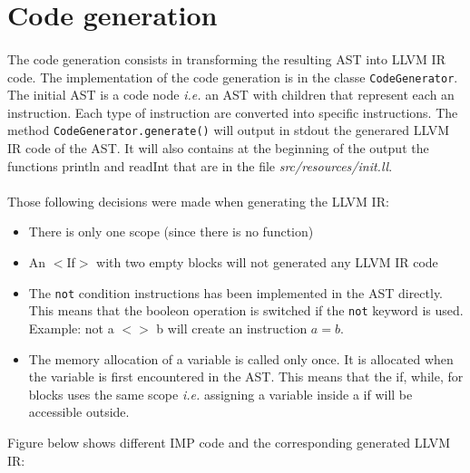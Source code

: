 \documentclass[letterpaper]{article}
\begin{document}
\section{Code generation}

\paragraph{}

The code generation consists in transforming the resulting AST into
LLVM IR code. The implementation of the code generation is in the
classe \texttt{CodeGenerator}. The initial AST is a code node \textit{i.e.}
an AST with children that represent each an instruction. Each type of
instruction are converted into specific instructions. The method
\texttt{CodeGenerator.generate()} will output in stdout the generared LLVM
IR code of the AST. It will also contains at the beginning of the output
the functions println and readInt that are in the file
 \textit{src/resources/init.ll}.

\paragraph{}


Those following
decisions were made when generating the LLVM IR:

\begin{itemize}
    \item There is only one scope (since there is no function)
    \item An $<$If$>$ with
    two empty blocks will not generated any LLVM IR code
    \item The \texttt{not} condition
    instructions has been implemented in the AST directly. This means that
    the booleon operation is switched if the \texttt{not} keyword is used.
    Example: not a $<>$ b will create an instruction $a = b$.
    \item The memory allocation of a variable is called only once.
    It is allocated when the variable is first encountered in the AST.
    This means that the if, while, for blocks uses the same scope \textit{i.e.}
    assigning a variable inside a if will be accessible outside.

\end{itemize}

Figure below shows different IMP code and the corresponding generated
LLVM IR:
\end{document}

